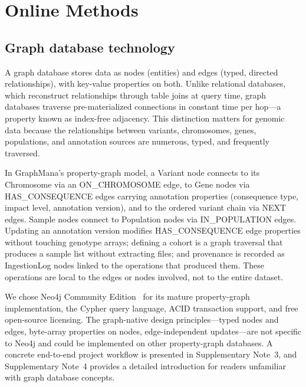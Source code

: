 \documentclass[pdflatex,sn-nature]{sn-jnl}
\begin{document}

\section*{Online Methods}

\subsection*{Graph database technology}

A graph database stores data as nodes (entities) and edges (typed, directed relationships), with key-value properties on both. Unlike relational databases, which reconstruct relationships through table joins at query time, graph databases traverse pre-materialized connections in constant time per hop---a property known as index-free adjacency. This distinction matters for genomic data because the relationships between variants, chromosomes, genes, populations, and annotation sources are numerous, typed, and frequently traversed.

In GraphMana's property-graph model, a Variant node connects to its Chromosome via an ON\_CHROMOSOME edge, to Gene nodes via HAS\_CONSEQUENCE edges carrying annotation properties (consequence type, impact level, annotation version), and to the ordered variant chain via NEXT edges. Sample nodes connect to Population nodes via IN\_POPULATION edges. Updating an annotation version modifies HAS\_CONSEQUENCE edge properties without touching genotype arrays; defining a cohort is a graph traversal that produces a sample list without extracting files; and provenance is recorded as IngestionLog nodes linked to the operations that produced them. These operations are local to the edges or nodes involved, not to the entire dataset.

We chose Neo4j Community Edition~\cite{neo4j} for its mature property-graph implementation, the Cypher query language, ACID transaction support, and free open-source licensing. The graph-native design principles---typed nodes and edges, byte-array properties on nodes, edge-independent updates---are not specific to Neo4j and could be implemented on other property-graph databases. A concrete end-to-end project workflow is presented in Supplementary Note~3, and Supplementary Note~4 provides a detailed introduction for readers unfamiliar with graph database concepts.
\end{document}
